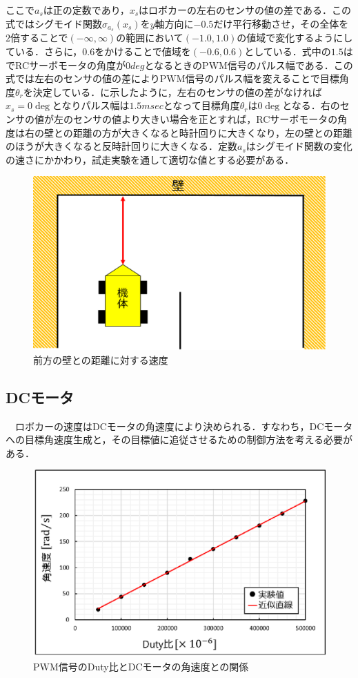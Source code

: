 \newpage
ここで$ a_{s}$は正の定数であり，$ x_{s}$はロボカーの左右のセンサの値の差である．この式ではシグモイド関数$\sigma_{a_{s}}(x_{s}) $を$y$軸方向に$-0.5$だけ平行移動させ，その全体を$2$倍することで$(-\infty,\infty)$の範囲において$(-1.0,1.0)$の値域で変化するようにしている．さらに，$0.6$をかけることで値域を$(-0.6,0.6)$としている．式中の$1.5$はでRCサーボモータの角度が$0\unit{deg}$となるときのPWM信号のパルス幅である．この式では左右のセンサの値の差によりPWM信号のパルス幅を変えることで目標角度$\theta_{r} $を決定している．に示したように，左右のセンサの値の差がなければ$x_{s}=0\unit{\deg}$となりパルス幅は$1.5\unit{msec}$となって目標角度$\theta_{r}$は$0\unit{\deg}$となる．右のセンサの値が左のセンサの値より大きい場合を正とすれば，RCサーボモータの角度は右の壁との距離の方が大きくなると時計回りに大きくなり，左の壁との距離のほうが大きくなると反時計回りに大きくなる．定数$a_{s}$はシグモイド関数の変化の速さにかかわり，試走実験を通して適切な値とする必要がある．

\newpage
 \begin{figure}[htb]
  \centering
    \includegraphics[width=0.6\hsize]{picture/eps/speed_wall.eps}
  \caption{前方の壁との距離に対する速度}
  \label{fig::speed_wall}
\end{figure}
\subsection{DCモータ}
　ロボカーの速度はDCモータの角速度により決められる．すなわち，DCモータへの目標角速度生成と，その目標値に追従させるための制御方法を考える必要がある．

\begin{figure}[htb]
  \centering
    \includegraphics[width=0.7\hsize]{picture/eps/duty_angvel_graph.eps}
  \caption{PWM信号のDuty比とDCモータの角速度との関係}
  \label{fig::duty_angvel_graph}
\end{figure}

